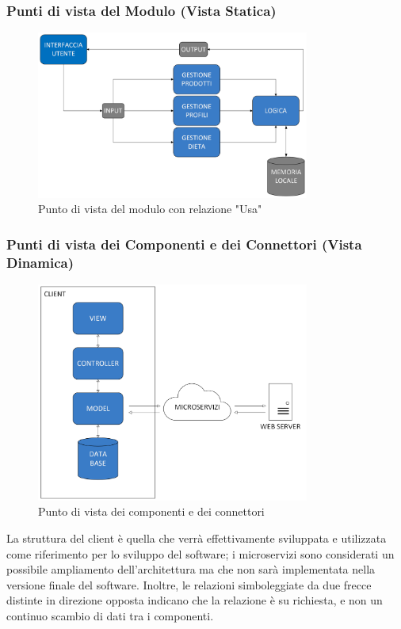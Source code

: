 \documentclass{article}
\begin{document}
\subsubsection{Punti di vista del Modulo (Vista Statica)}
\begin{figure}[H]
    \centering
    \includegraphics[width=0.8\textwidth]{imgs/VistaModuloUso.png}
    \caption{Punto di vista del modulo con relazione "Usa"}
    \label{fig:enter-label}
\end{figure}
\subsubsection{Punti di vista dei Componenti e dei Connettori (Vista Dinamica)}

\begin{figure}[H]
    \centering
    \includegraphics[width=0.8\textwidth]{imgs/Vista.png}
    \caption{Punto di vista dei componenti e dei connettori}
    \label{fig:enter-label}
\end{figure}

La struttura del client è quella che verrà effettivamente sviluppata e utilizzata come riferimento per lo sviluppo del software; i microservizi sono considerati un possibile ampliamento dell'architettura ma che non sarà implementata nella versione finale del software. Inoltre, le relazioni simboleggiate da due frecce distinte in direzione opposta indicano che la relazione è su richiesta, e non un continuo scambio di dati tra i componenti.  
\end{document}
